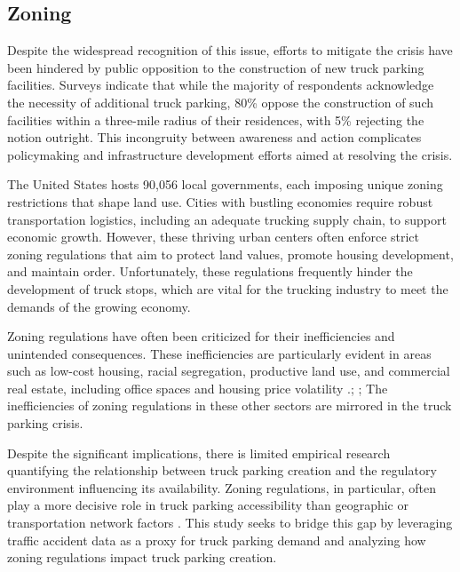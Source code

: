 \documentclass[
  12pt]{article}
\begin{document}
\subsection{Zoning}\label{zoning}

Despite the widespread recognition of this issue, efforts to mitigate
the crisis have been hindered by public opposition to the construction
of new truck parking facilities. Surveys indicate that while the
majority of respondents acknowledge the necessity of additional truck
parking, 80\% oppose the construction of such facilities within a
three-mile radius of their residences, with 5\% rejecting the notion
outright. This incongruity between awareness and action complicates
policymaking and infrastructure development efforts aimed at resolving
the crisis.

The United States hosts 90,056 local governments, each imposing unique
zoning restrictions that shape land use. Cities with bustling economies
require robust transportation logistics, including an adequate trucking
supply chain, to support economic growth. However, these thriving urban
centers often enforce strict zoning regulations that aim to protect land
values, promote housing development, and maintain order. Unfortunately,
these regulations frequently hinder the development of truck stops,
which are vital for the trucking industry to meet the demands of the
growing economy.

Zoning regulations have often been criticized for their inefficiencies
and unintended consequences. These inefficiencies are particularly
evident in areas such as low-cost housing, racial segregation,
productive land use, and commercial real estate, including office spaces
and housing price volatility
\citet{glaeserImpactBuildingRestrictions2003}.;
\citet{galeReviewColorLaw2019}; \citet{PDFTriumphCity2024} The
inefficiencies of zoning regulations in these other sectors are mirrored
in the truck parking crisis.

Despite the significant implications, there is limited empirical
research quantifying the relationship between truck parking creation and
the regulatory environment influencing its availability. Zoning
regulations, in particular, often play a more decisive role in truck
parking accessibility than geographic or transportation network factors
\citep{shertzerZoningEconomicGeography2018}. This study seeks to bridge
this gap by leveraging traffic accident data as a proxy for truck
parking demand and analyzing how zoning regulations impact truck parking
creation.
\end{document}
